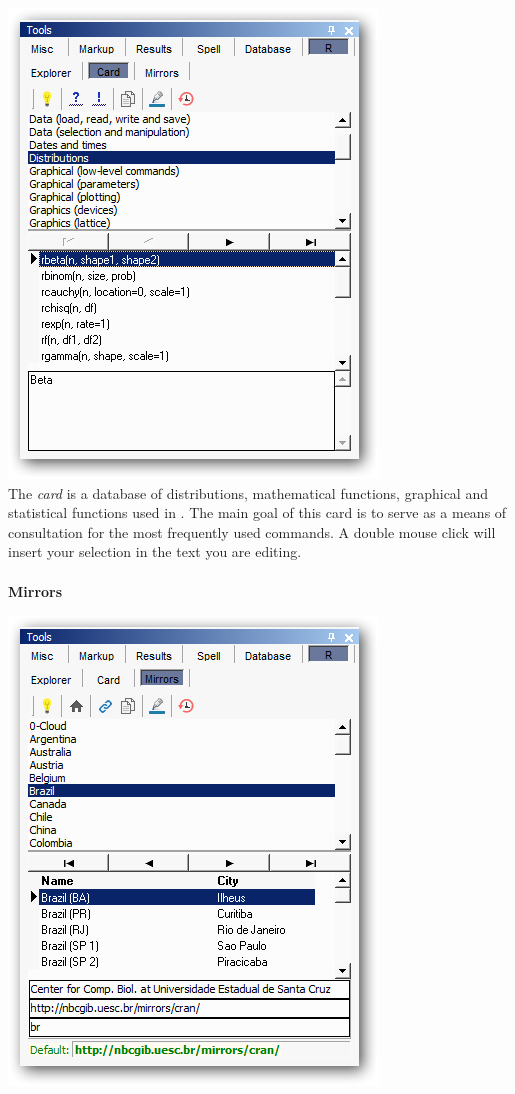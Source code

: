 \includegraphics[scale=0.50]{./res/tools_r_card.png} \\

The \textit{card} is a database of distributions, mathematical functions, graphical and statistical functions used in \RR{}.
The main goal of this card is to serve as a means of consultation for the most frequently used commands.
A double mouse click will insert your selection in the text you are editing.

\paragraph{}\textbf{Mirrors}\\

\includegraphics[scale=0.50]{./res/tools_r_mirrors.png} \\

